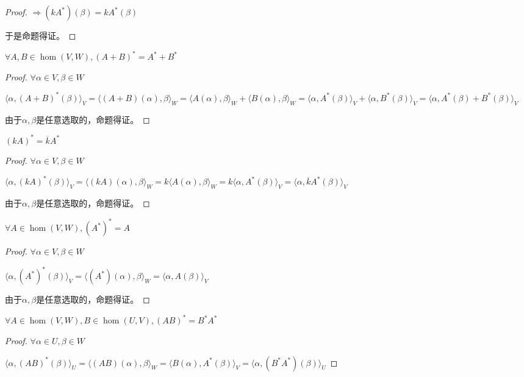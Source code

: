 \documentclass[12pt, a4paper, oneside, UTF8]{ctexbook}
\begin{document}
\begin{para}{0}
\begin{proof}
						$\Rightarrow (kA^*)(\beta )=kA^*(\beta )$

						于是命题得证。
					\end{proof}
				\point{}
					\begin{proposition}
						$\forall A,B \in \hom(V,W),(A+B)^* = A^* + B^*$
					\end{proposition}
					\begin{proof}
						$\forall \alpha \in V,\beta \in W$

						$\langle \alpha ,(A+B)^*(\beta ) \rangle_V =\langle (A+B)(\alpha ),\beta \rangle_W =\langle A(\alpha ),\beta \rangle_W +\langle B(\alpha ),\beta \rangle_W =\langle \alpha ,A^*(\beta ) \rangle_V +\langle \alpha ,B^*(\beta ) \rangle_V =\langle \alpha ,A^*(\beta )+B^*(\beta ) \rangle_V$

						由于$\alpha ,\beta $是任意选取的，命题得证。
					\end{proof}
				\point{}
					\begin{proposition}
						$(kA)^*=\overline{k}A^*$
					\end{proposition}
					\begin{proof}
						$\forall \alpha\in V,\beta \in W$

						$\langle \alpha ,(kA)^*(\beta ) \rangle_V =\langle (kA)(\alpha ),\beta \rangle_W=k\langle A(\alpha ),\beta \rangle_W=k\langle \alpha ,A^*(\beta ) \rangle_V =\langle \alpha ,\overline{k}A^*(\beta ) \rangle_V$

						由于$\alpha ,\beta $是任意选取的，命题得证。
					\end{proof}
				\point{}
					\begin{proposition}
						$\forall A \in \hom(V,W), (A^*)^* = A$
					\end{proposition}
					\begin{proof}
						$\forall \alpha  \in V,\beta \in W$

						$\langle \alpha ,(A^*)^*(\beta ) \rangle_V =\langle (A^*)(\alpha ),\beta \rangle_W =\langle \alpha ,A(\beta ) \rangle_V$

						由于$\alpha ,\beta $是任意选取的，命题得证。
					\end{proof}
				\point{}
					\begin{proposition}
						$\forall A \in \hom(V,W), B \in \hom(U,V),(AB)^*=B^*A^*$
					\end{proposition}
					\begin{proof}
						$\forall \alpha \in U,\beta \in W$

						$\langle \alpha ,(AB)^*(\beta )\rangle_U = \langle (AB)(\alpha ),\beta \rangle_W = \langle B(\alpha ),A^*(\beta )\rangle_V = \langle \alpha ,(B^*A^*)(\beta )\rangle_U$


\end{proof}
\end{para}
\end{document}
